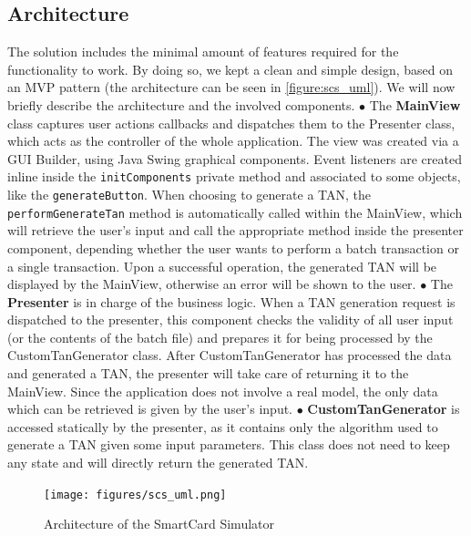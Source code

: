 \subsection{Architecture}
The solution includes the minimal amount of features required for the functionality to work. By doing so, we kept a clean and simple design, based on an MVP pattern (the architecture can be seen in \autoref{figure:scs_uml}). We will now briefly describe the architecture and the involved components.\newline
$\bullet$ The \textbf{MainView} class captures user actions callbacks and dispatches them to the Presenter class, which acts as the controller of the whole application. The view was created via a GUI Builder, using Java Swing graphical components.\newline
Event listeners are created inline inside the \texttt{initComponents} private method and associated to some objects, like the \texttt{generateButton}. When choosing to generate a TAN, the \texttt{performGenerateTan} method is automatically called within the MainView, which will retrieve the user's input and call the appropriate method inside the presenter component, depending whether the user wants to perform a batch transaction or a single transaction.\newline
Upon a successful operation, the generated TAN will be displayed by the MainView, otherwise an error will be shown to the user.\newline
$\bullet$ The \textbf{Presenter} is in charge of the business logic. When a TAN generation request is dispatched to the presenter, this component checks the validity of all user input (or the contents of the batch file) and prepares it for being processed by the CustomTanGenerator class. After CustomTanGenerator has processed the data and generated a TAN, the presenter will take care of returning it to the MainView.
Since the application does not involve a real model, the only data which can be retrieved is given by the user's input.\newline
$\bullet$ \textbf{CustomTanGenerator} is accessed statically by the presenter, as it contains only the algorithm used to generate a TAN given some input parameters. This class does not need to keep any state and will directly return the generated TAN.

\begin{figure}[h!tbp]
	\centering
	\texttt{[image: figures/scs\_uml.png]}
	\caption{Architecture of the SmartCard Simulator}
	\label{figure:scs_uml}
\end{figure}


